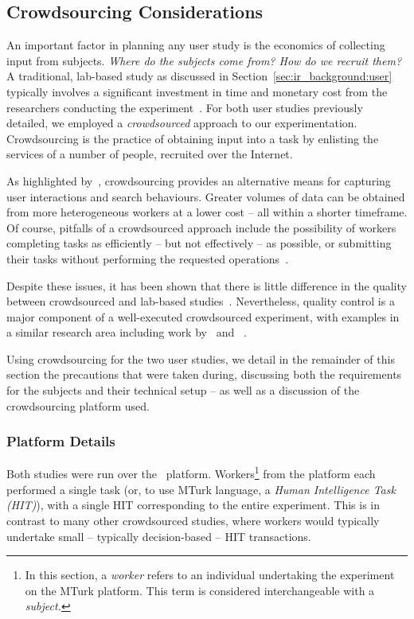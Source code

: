 \subsection{Crowdsourcing Considerations}\label{sec:methodology:user:crowdsourcing}
An important factor in planning any user study is the economics of collecting input from subjects. \emph{Where do the subjects come from? How do we recruit them?} A traditional, lab-based study as discussed in Section~\ref{sec:ir_background:user} typically involves a significant investment in time and monetary cost from the researchers conducting the experiment~\citep{spool2001testing}. For both user studies previously detailed, we employed a \emph{crowdsourced} approach to our experimentation. Crowdsourcing is the practice of obtaining input into a task by enlisting the services of a number of people, recruited over the Internet.

As highlighted by~\cite{zuccon2013crowdsourcing_comparisons}, crowdsourcing provides an alternative means for capturing user interactions and search behaviours. Greater volumes of data can be obtained from more heterogeneous workers at a lower cost -- all within a shorter timeframe. Of course, pitfalls of a crowdsourced approach include the possibility of workers completing tasks as efficiently -- but not effectively -- as possible, or submitting their tasks without performing the requested operations~\citep{feild2010turkers}.

Despite these issues, it has been shown that there is little difference in the quality between crowdsourced and lab-based studies~\citep{kely2011user_study, zuccon2013crowdsourcing_comparisons}. Nevertheless, quality control is a major component of a well-executed crowdsourced experiment, with examples in a similar research area including work by~\cite{kazai2011crowdsourced} and ~\cite{crescenzi2013crowdsourced}.

Using crowdsourcing for the two user studies, we detail in the remainder of this section the precautions that were taken during, discussing both the requirements for the subjects and their technical setup -- as well as a discussion of the crowdsourcing platform used.

\subsubsection{Platform Details}\label{sec:methodology:user:crowdsourcing:platform}
Both studies were run over the~ platform. Workers\footnote{In this section, a \emph{worker} refers to an individual undertaking the experiment on the MTurk platform. This term is considered interchangeable with a \emph{subject.}} from the platform each performed a single task (or, to use MTurk language, a \emph{Human Intelligence Task (HIT)}), with a single HIT corresponding to the entire experiment. This is in contrast to many other crowdsourced studies, where workers would typically undertake small -- typically decision-based -- HIT transactions.

